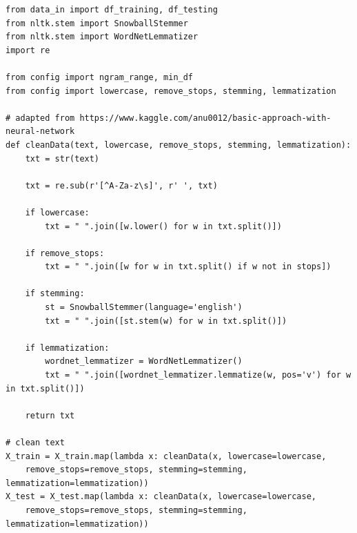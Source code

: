\documentclass[a4paper, 11pt]{article}
\begin{document}
\begin{lstlisting}
from data_in import df_training, df_testing
from nltk.stem import SnowballStemmer
from nltk.stem import WordNetLemmatizer
import re

from config import ngram_range, min_df
from config import lowercase, remove_stops, stemming, lemmatization

# adapted from https://www.kaggle.com/anu0012/basic-approach-with-neural-network
def cleanData(text, lowercase, remove_stops, stemming, lemmatization):
    txt = str(text)

    txt = re.sub(r'[^A-Za-z\s]', r' ', txt)

    if lowercase:
        txt = " ".join([w.lower() for w in txt.split()])

    if remove_stops:
        txt = " ".join([w for w in txt.split() if w not in stops])

    if stemming:
        st = SnowballStemmer(language='english')
        txt = " ".join([st.stem(w) for w in txt.split()])

    if lemmatization:
        wordnet_lemmatizer = WordNetLemmatizer()
        txt = " ".join([wordnet_lemmatizer.lemmatize(w, pos='v') for w in txt.split()])

    return txt

# clean text
X_train = X_train.map(lambda x: cleanData(x, lowercase=lowercase, 
    remove_stops=remove_stops, stemming=stemming, lemmatization=lemmatization))
X_test = X_test.map(lambda x: cleanData(x, lowercase=lowercase, 
    remove_stops=remove_stops, stemming=stemming, lemmatization=lemmatization))

\end{lstlisting}
\end{document}
